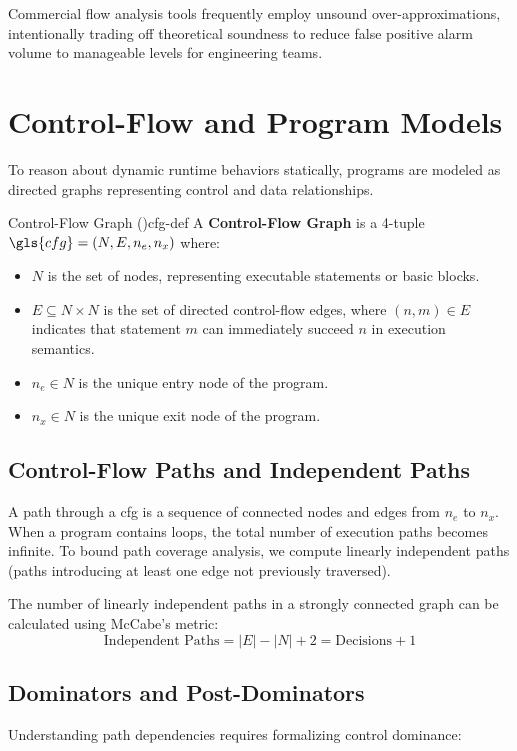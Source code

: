Commercial flow analysis tools frequently employ unsound over-approximations, intentionally trading off theoretical soundness to reduce false positive alarm volume to manageable levels for engineering teams.

\section{Control-Flow and Program Models}
\label{sec:control_flow_models}

To reason about dynamic runtime behaviors statically, programs are modeled as directed graphs representing control and data relationships. 

\begin{definition}{Control-Flow Graph ()}{cfg-def}
A \textbf{Control-Flow Graph} is a 4-tuple $\gls{cfg} = (N, E, n_e, n_x)$ where:
\begin{itemize}
    \item $N$ is the set of nodes, representing executable statements or basic blocks.
    \item $E \subseteq N \times N$ is the set of directed control-flow edges, where $(n, m) \in E$ indicates that statement $m$ can immediately succeed $n$ in execution semantics.
    \item $n_e \in N$ is the unique entry node of the program.
    \item $n_x \in N$ is the unique exit node of the program.
\end{itemize}
\end{definition}

\subsection{Control-Flow Paths and Independent Paths}
A path through a \gls{cfg} is a sequence of connected nodes and edges from $n_e$ to $n_x$. When a program contains loops, the total number of execution paths becomes infinite. To bound path coverage analysis, we compute linearly independent paths (paths introducing at least one edge not previously traversed).

The number of linearly independent paths in a strongly connected graph can be calculated using McCabe's metric:
\begin{equation}
\text{Independent Paths} = |E| - |N| + 2 = \text{Decisions} + 1
\end{equation}

\subsection{Dominators and Post-Dominators}
Understanding path dependencies requires formalizing control dominance:

